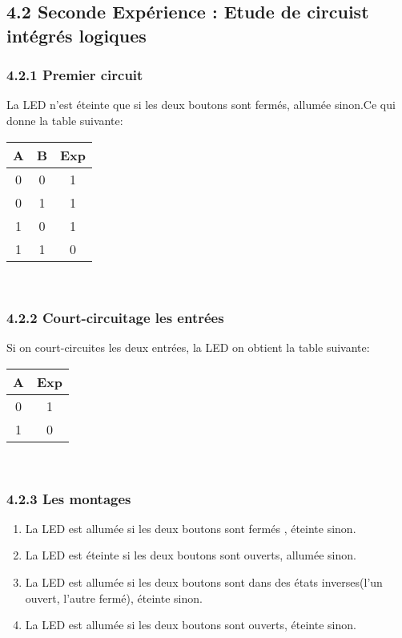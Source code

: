 \documentclass{report}
\begin{document}
\subsection*{4.2 Seconde Expérience : Etude de circuist int\'egr\'es logiques}
\subsubsection*{4.2.1 Premier circuit}
\hspace*{1,5cm} La LED n'est \'eteinte que si les deux boutons sont ferm\'es, allum\'ee sinon.Ce qui donne la table suivante:\\
\begin{tabular}{|c|c|c|}
\hline
A & B & Exp \\
\hline
0&0&1\\
0&1&1\\
1&0&1\\
1&1&0\\
\hline
\end{tabular}\\
\subsubsection*{4.2.2 Court-circuitage les entr\'ees}
\hspace*{1,5cm} Si on court-circuites les deux entr\'ees, la LED on obtient la table
suivante:\\
\begin{tabular}{|c|c|}
\hline
A & Exp \\
\hline
0&1\\
1&0\\
\hline
\end{tabular}\\
\subsubsection*{4.2.3 Les montages}
\begin{enumerate}
\item La LED est allum\'ee si les deux boutons sont ferm\'es , \'eteinte sinon.
\item La LED est \'eteinte si les deux boutons sont ouverts, allum\'ee sinon.
\item La LED est allum\'ee si les deux boutons sont dans des \'etats inverses(l'un ouvert, l'autre ferm\'e), \'eteinte sinon.
\item La LED est allum\'ee si les deux boutons sont ouverts, \'eteinte sinon.
\end{enumerate}
\newpage
\end{document}

